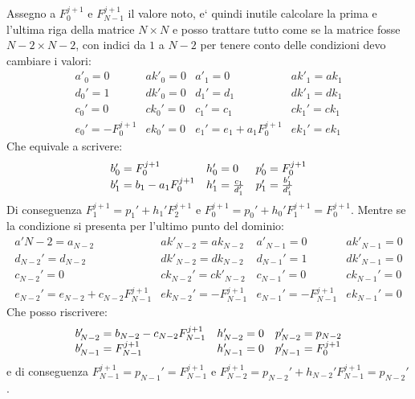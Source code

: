 Assegno a $F_0^{j+1}$ e $F_{N-1}^{j+1}$ il valore noto, e` quindi inutile calcolare la prima e l'ultima riga della matrice $N\times N$ e posso trattare tutto come se la matrice fosse $N-2\times N-2$, con indici da $1$ a $N-2$ per tenere conto delle condizioni devo cambiare i valori:
\begin{equation}
\begin{array}{ll|ll}
	a'_0 = 0 & ak'_0= 0&	a'_1 = 0 & ak'_1= ak_1\\
	d_0' = 1& dk'_0 = 0&	d_1' = d_1& dk'_1 = dk_1\\
	c_0' =  0& ck_0' = 0&	c_1' =  c_1& ck_1' = ck_1\\
	e_0' = -F_0^{j+1} & ek_0' = 0&	e_1' = e_1+a_1 F^{j+1}_0 & ek_1' = ek_1
\end{array}
\end{equation}
Che equivale  a scrivere:
\begin{equation}
\begin{array}{l l l}
b_0' = F_0^{j+1}&h_0' = 0&p_0' = F_0^{j+1}\\
b_1' = b_1 - a_1 F_0^{j+1}  &h_1' = \frac{c_1}{d_1'}&p_1' = \frac{b_1'}{d_1'}
\end{array}
\end{equation}
Di conseguenza $F_1^{j+1} = p_1' + h_1'F_2^{j+1}$ e $F_0^{j+1} = p_0' + h_0' F_1^{j+1} = F_0^{j+1}$. Mentre se la condizione si presenta per l'ultimo punto del dominio:
\begin{equation}
\begin{array}{ll|ll}
a'{N-2} = a_{N-2} & ak'_{N-2}= ak_{N-2} &	a'_{N-1} = 0 & ak'_{N-1}= 0\\
d_{N-2}' = d_{N-2}& dk'_{N-2} = dk_{N-2}&	d_{N-1}' = 1& dk'_{N-1} = 0\\
c_{N-2}' =  0& ck_{N-2}' = ck'_{N-2}	&	c_{N-1}' =  0& ck_{N-1}' = 0\\
e_{N-2}' = e_{N-2}+c_{N-2}F_{N-1}^{j+1} & ek_{N-2}' = - F^{j+1}_{N-1}&	e_{N-1}' =  -F^{j+1}_{N-1} & ek_{N-1}' = 0
\end{array}
\end{equation}
Che posso riscrivere:
\begin{equation}
\begin{array}{l l l}
b_{N-2}' = b_{N-2} - c_{N-2} F_{N-1}^{j+1}  &h_{N-2}' = 0&p_{N-2}' = p_{N-2}\\
b_{N-1}' = F_{N-1}^{j+1}&h_{N-1}' = 0&p_{N-1}' = F_0^{j+1}
\end{array}
\end{equation}
e di conseguenza $F_{N-1}^{j+1} = p_{N-1}' = F_{N-1}^{j+1}$ e $F_{N-2}^{j+1} = p_{N-2}'+h_{N-2}' F_{N-1}^{j+1} =  p_{N-2}'$.

